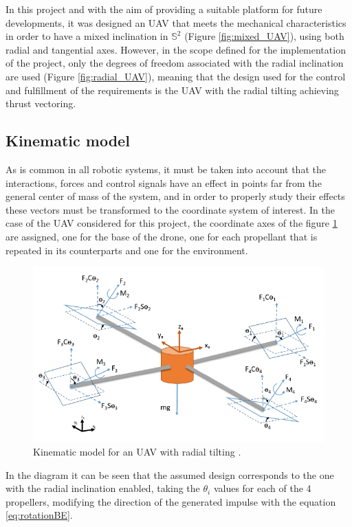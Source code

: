 \documentclass[a4paper, 12pt, oneside]{book}
\begin{document}
In this project and with the aim of providing a suitable platform for future developments, it  was designed an UAV that meets the mechanical characteristics in order to have a mixed inclination in $\mathbb{S}^2$ (Figure \ref{fig:mixed_UAV}), using both radial and tangential axes. However, in the scope defined for the implementation of the project, only the degrees of freedom associated with the radial inclination are used (Figure \ref{fig:radial_UAV}), meaning that the design used for the control and fulfillment of the requirements is the UAV with the radial tilting achieving thrust vectoring.

\subsection{Kinematic model}
As is common in all robotic systems, it must be taken into account that the interactions, forces and control signals have an effect in points far from the general center of mass of the system, and in order to properly study their effects these vectors must be transformed to the coordinate system of interest. In the case of the UAV considered for this project, the coordinate axes of the figure \ref{fig:kin_UAV} are assigned, one for the base of the drone, one for each propellant that is repeated in its counterparts and one for the environment.

\begin{figure}[H]
    \begin{center}
        \includegraphics[width=.75\linewidth]{figures/kin_UAV.PNG}
        \caption{Kinematic model for an UAV with radial tilting \cite{kumar2017position}.}
        \label{fig:kin_UAV}
    \end{center}
\end{figure}

In the diagram it can be seen that the assumed design corresponds to the one with the radial inclination enabled, taking the $\theta_i$ values for each of the 4 propellers, modifying the direction of the generated impulse with the equation \ref{eq:rotationBE}.
\end{document}

